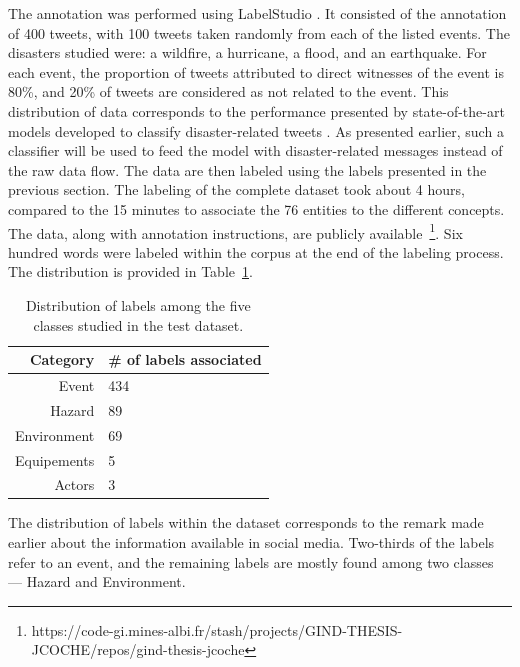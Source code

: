 The annotation was performed using LabelStudio \parencite{tkachenkoLabelStudioData2020}.
It consisted of the annotation of 400 tweets, with 100 tweets taken randomly from each of the listed events.
The disasters studied were: a wildfire, a hurricane, a flood, and an earthquake.
For each event, the proportion of tweets attributed to direct witnesses of the event is 80\%, and 20\% of tweets are considered as not related to the event.
This distribution of data corresponds to the performance presented by state-of-the-art models developed to classify disaster-related tweets \parencite{xukunImprovingDisasterrelatedTweet2020}.
As presented earlier, such a classifier will be used to feed the model with disaster-related messages instead of the raw data flow.
The data are then labeled using the labels presented in the previous section.
The labeling of the complete dataset took about 4 hours, compared to the 15 minutes to associate the 76 entities to the different concepts.
The data, along with annotation instructions, are publicly available~\footnote{https://code-gi.mines-albi.fr/stash/projects/GIND-THESIS-JCOCHE/repos/gind-thesis-jcoche}.
Six hundred words were labeled within the corpus at the end of the labeling process.
The distribution is provided in Table~\ref{table:labels-distribution}.

\begin{table}[bht]
    \centering
    \caption{Distribution of labels among the five classes studied in the test dataset.}
    \begin{tabular}{rl}
        Category    & \# of labels associated \\
        \toprule
        Event       & 434                     \\
        Hazard      & 89                      \\
        Environment & 69                      \\
        Equipements & 5                       \\
        Actors      & 3                       \\
        \bottomrule
    \end{tabular}
    \label{table:labels-distribution}
\end{table}

The distribution of labels within the dataset corresponds to the remark made earlier about
the information available in social media.
Two-thirds of the labels refer to an event, and the remaining labels are mostly found among
two classes — Hazard and Environment.

